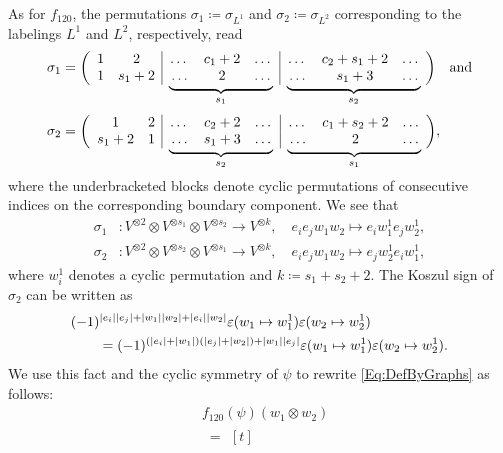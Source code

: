 \documentclass[\MainFolder/Text.tex]{subfiles}
\begin{document}
\begin{Example}
As for $f_{120}$, the permutations $\sigma_1\coloneqq\sigma_{L^1}$ and $\sigma_2\coloneqq \sigma_{L^2}$ corresponding to the labelings $L^1$ and $L^2$, respectively, read
\[\begin{aligned}
\sigma_{1} &= \biggl(\begin{array}{cc|ccc|ccc}
1 & 2      & \dots & c_1+2 & \dots & \dots & c_2 + s_1 + 2 & \dots \\
 1 & s_1 + 2& \undermat{s_1}{\dots & c_1+2 & \dots}\dots & 2 & \dots &\undermat{s_2}{\dots & c_2 + s_1 + 2 & \dots}\dots & s_1 + 3 & \dots
\end{array}\biggr)\quad\text{and} \\[4ex]
\sigma_{2} &= \biggl(\begin{array}{cc|ccc|ccc}
 1       & 2 &  \dots  & c_2 + 2 & \dots & \dots & c_1 + s_2 + 2 & \dots  \\
 s_1 + 2 & 1 & \undermat{s_2}{\dots & c_2+2 & \dots} \dots  & s_1 + 3 & \dots & \undermat{s_1}{\dots & c_1 + s_2 + 2 & \dots} \dots &  2     & \dots
\end{array}\biggr), \\[3ex]
\end{aligned}\]
where the underbracketed blocks denote cyclic permutations of consecutive indices on the corresponding boundary component. We see that 
\[\begin{aligned}
\sigma_1 &: V^{\otimes 2}\otimes V^{\otimes s_1}\otimes V^{\otimes s_2} \longrightarrow V^{\otimes k}, \quad e_i e_j w_1 w_2 \longmapsto e_i w_1^1 e_j w_2^1, \\
\sigma_2 &:  V^{\otimes 2}\otimes V^{\otimes s_2} \otimes V^{\otimes s_1} \longrightarrow V^{\otimes k}, \quad  e_i e_j w_1 w_2 \longmapsto e_j w_2^1 e_i w_1^1,
\end{aligned}\]
where $w_i^1$ denotes a cyclic permutation and $k\coloneqq s_1 + s_2 +2$. The Koszul sign of~$\sigma_2$ can be written as
\[\begin{aligned}&(-1)^{|e_i||e_j| + |w_1||w_2| + |e_i||w_2|} \varepsilon(w_1 \mapsto w_1^1)\varepsilon(w_2\mapsto w_2^1)\\
&\qquad= (-1)^{(|e_i| + |w_1|)(|e_j| + |w_2|) + |w_1| |e_j|}\varepsilon(w_1 \mapsto w_1^1)\varepsilon(w_2\mapsto w_2^1).\end{aligned}\]
We use this fact and the cyclic symmetry of $\psi$ to rewrite \eqref{Eq:DefByGraphs} as follows:
\[\begin{aligned}
&f_{120}(\psi)(w_1 \otimes w_2)
\\&\; = \begin{aligned}[t]

\end{aligned}
\end{aligned}\]
\end{Example}
\end{document}
